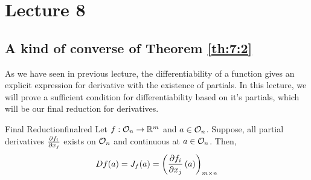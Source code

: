 \documentclass[../Analysis-3.tex]{subfiles}
\begin{document}
\chapter*{Lecture 8} %
\setcounter{chapter}{8} %
\setcounter{section}{0}

\section{A kind of converse of Theorem \ref{th:7:2}}

As we have seen in previous lecture, the differentiability of a function gives an explicit expression for derivative with the existence of partials. In this lecture, we will prove a sufficient condition for differentiability based on it's partials, which will be our final reduction for derivatives.

\begin{Thm}{Final Reduction}{finalred}
  Let $ f :\mathcal{O}_{n} \to \mathbb{R}^m $ and $ a \in \mathcal{O}_{n} $. Suppose, all partial derivatives $ \pdv{f_i}{x_j} $ exists on $ \mathcal{O}_{n} $ and continuous at $ a \in \mathcal{O}_{n} $. Then,
  \begin{align*}
    Df(a) = J_{f}(a) = \left( \pdv{f_i}{x_j}\left( a \right) \right)_{m \times n}
  \end{align*}
\end{Thm}
\end{document}
